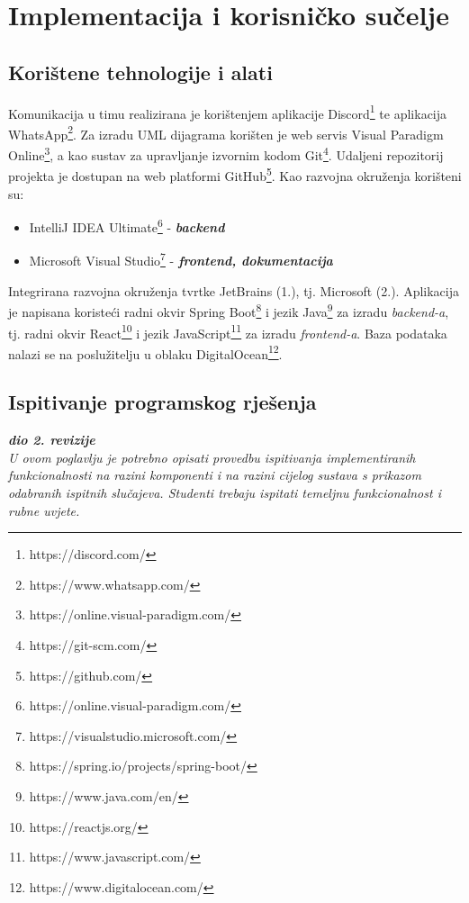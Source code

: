 \chapter{Implementacija i korisničko sučelje}
		
		
		\section{Korištene tehnologije i alati}
		
			Komunikacija u timu realizirana je korištenjem aplikacije Discord\footnote[1]{https://discord.com/} te aplikacija WhatsApp\footnote[2]{https://www.whatsapp.com/}. Za izradu UML dijagrama korišten je
			web servis Visual Paradigm Online\footnote[3]{https://online.visual-paradigm.com/}, a kao sustav za upravljanje izvornim kodom Git\footnote[4]{https://git-scm.com/}. Udaljeni repozitorij projekta je dostupan na
			web platformi GitHub\footnote[5]{https://github.com/}.
			\smallbreak
			\noindent Kao razvojna okruženja korišteni su:
			\begin{itemize}
				\item IntelliJ IDEA Ultimate\footnote[6]{https://online.visual-paradigm.com/} - \textit{\textbf{backend}}
				\item Microsoft Visual Studio\footnote[7]{https://visualstudio.microsoft.com/} - \textit{\textbf{frontend, dokumentacija}}
			\end{itemize}
			\noindent Integrirana razvojna okruženja tvrtke JetBrains (1.), tj. Microsoft (2.).
			\smallbreak
			Aplikacija je napisana koristeći radni okvir Spring Boot\footnote[8]{https://spring.io/projects/spring-boot/} i jezik Java\footnote[9]{https://www.java.com/en/} za izradu 
			\textit{backend-a}, tj. radni okvir React\footnote[10]{https://reactjs.org/} i jezik JavaScript\footnote[11]{https://www.javascript.com/} za izradu \textit{frontend-a}.
			\smallbreak
			Baza podataka nalazi se na poslužitelju u oblaku DigitalOcean\footnote[12]{https://www.digitalocean.com/}.
			\eject 
		
	
		\section{Ispitivanje programskog rješenja}
			
			\textbf{\textit{dio 2. revizije}}\\
			
			 \textit{U ovom poglavlju je potrebno opisati provedbu ispitivanja implementiranih funkcionalnosti na razini komponenti i na razini cijelog sustava s prikazom odabranih ispitnih slučajeva. Studenti trebaju ispitati temeljnu funkcionalnost i rubne uvjete.}
	
